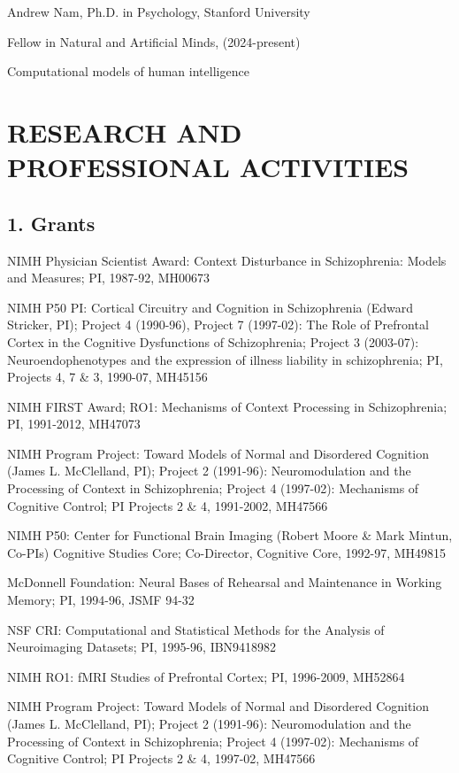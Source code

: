 \documentclass[10 pt]{article}
\begin{document}
Andrew Nam, Ph.D. in Psychology, Stanford University

Fellow in Natural and Artificial Minds, (2024-present)

Computational models of human intelligence
    \medskip


\section*{RESEARCH AND PROFESSIONAL ACTIVITIES} \label{secRAPA}

\subsection*{1. Grants} \label{secRAPA1}

NIMH Physician Scientist Award:
Context Disturbance in Schizophrenia: Models and Measures;
PI,
1987-92,
MH00673

NIMH P50 PI:
Cortical Circuitry and Cognition in Schizophrenia (Edward Stricker, PI);
Project 4 (1990-96),
Project 7 (1997-02): The Role of Prefrontal Cortex in the Cognitive Dysfunctions of Schizophrenia;
Project 3 (2003-07): Neuroendophenotypes and the expression of illness liability in schizophrenia;
PI, Projects 4, 7 \& 3,
1990-07,
MH45156

NIMH FIRST Award; RO1:
Mechanisms of Context Processing in Schizophrenia;
PI,
1991-2012,
MH47073

NIMH Program Project:
Toward Models of Normal and Disordered Cognition (James L. McClelland, PI);
Project 2 (1991-96): Neuromodulation and the Processing of Context in Schizophrenia;
Project 4 (1997-02): Mechanisms of Cognitive Control;
PI Projects 2 \& 4,
1991-2002,
MH47566

NIMH P50:
Center for Functional Brain Imaging (Robert Moore \& Mark Mintun, Co-PIs) Cognitive Studies Core;
Co-Director, Cognitive Core,
1992-97,
MH49815

McDonnell Foundation:
Neural Bases of Rehearsal and Maintenance in Working Memory;
PI,
1994-96,
JSMF 94-32

NSF CRI:
Computational and Statistical Methods for the Analysis of Neuroimaging Datasets;
PI,
1995-96,
IBN9418982

NIMH RO1:
fMRI Studies of Prefrontal Cortex;
PI,
1996-2009,
MH52864

NIMH Program Project:
Toward Models of Normal and Disordered Cognition (James L. McClelland, PI);
Project 2 (1991-96): Neuromodulation and the Processing of Context in Schizophrenia;
Project 4 (1997-02): Mechanisms of Cognitive Control;
PI Projects 2 \& 4,
1997-02,
MH47566
\end{document}
